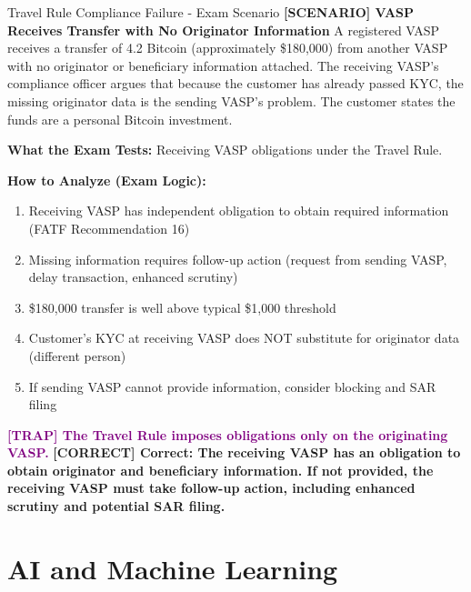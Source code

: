 \documentclass[11pt,a4paper]{beamer}
\newcommand{\trap}[1]{\textcolor{purple}{\textbf{[TRAP] #1}}}
\newcommand{\correct}[1]{\textcolor{green!50!black}{\textbf{[CORRECT] #1}}}
\newcommand{\scenario}[1]{\textcolor{blue!70!black}{\textbf{[SCENARIO] #1}}}
\begin{document}
	\begin{frame}{Travel Rule Compliance Failure - Exam Scenario}
		\scenario{VASP Receives Transfer with No Originator Information}
		A registered VASP receives a transfer of 4.2 Bitcoin (approximately \$180,000) from another VASP with no originator or beneficiary information attached. The receiving VASP's compliance officer argues that because the customer has already passed KYC, the missing originator data is the sending VASP's problem. The customer states the funds are a personal Bitcoin investment.
		
		\textbf{What the Exam Tests:} Receiving VASP obligations under the Travel Rule.
		
		\textbf{How to Analyze (Exam Logic):}
		\begin{enumerate}
			\item Receiving VASP has independent obligation to obtain required information (FATF Recommendation 16)
			\item Missing information requires follow-up action (request from sending VASP, delay transaction, enhanced scrutiny)
			\item \$180,000 transfer is well above typical \$1,000 threshold
			\item Customer's KYC at receiving VASP does NOT substitute for originator data (different person)
			\item If sending VASP cannot provide information, consider blocking and SAR filing
		\end{enumerate}
		
		\trap{The Travel Rule imposes obligations only on the originating VASP.}
		\correct{Correct: The receiving VASP has an obligation to obtain originator and beneficiary information. If not provided, the receiving VASP must take follow-up action, including enhanced scrutiny and potential SAR filing.}
	\end{frame}
	
	\section{AI and Machine Learning}
	
\end{document}
